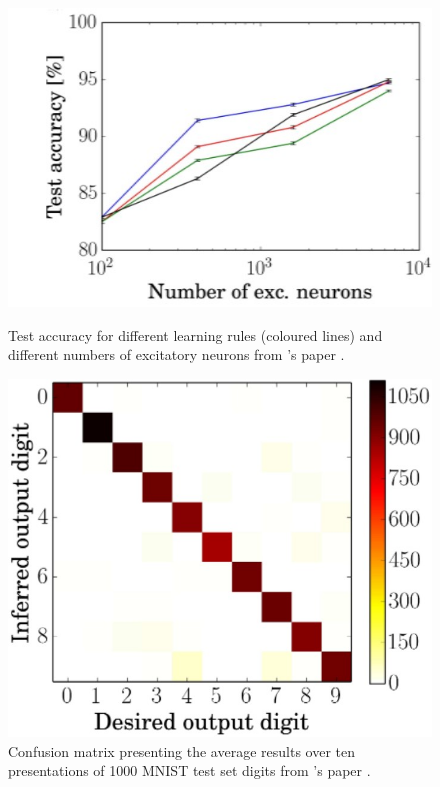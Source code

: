 \begin{figure}[http]
    \begin{minipage}[b]{.5\linewidth}
         \includegraphics[width=\linewidth]{pictures/num_exc_neurons_test_acc.jpg}
         \caption{Test accuracy for different learning rules (coloured lines) and different numbers of excitatory neurons from \authorsSNN{}'s paper \cite{SNN}.}
         \label{img:test_acc}
    \end{minipage}
    \hspace{0.06\linewidth}%
    \begin{minipage}[b]{.4\linewidth}
         \includegraphics[width=\linewidth]{pictures/error_analysis_confusion_matrix.jpg}
         \caption{Confusion matrix presenting the average results over ten presentations of 1000 MNIST test set digits from \authorsSNN{}'s paper \cite{SNN}.}
         \label{img:error_analysis}
    \end{minipage}
\end{figure}

